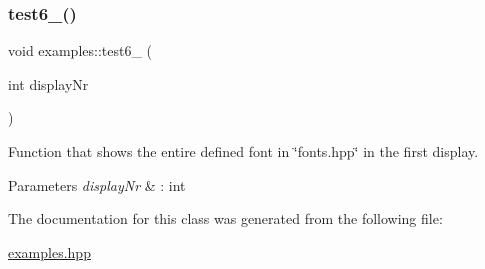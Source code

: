 \subsubsection{\texorpdfstring{test6\+\_()}{test6\_2()}}
{\footnotesize\ttfamily void examples\+::test6\+\_ (\begin{DoxyParamCaption}\item[{int}]{display\+Nr }\end{DoxyParamCaption})\hspace{0.3cm}{\ttfamily [inline]}}



Function that shows the entire defined font in \char`\"{}fonts.\+hpp\char`\"{} in the first display. 


\begin{DoxyParams}{Parameters}
{\em display\+Nr} & \+: int \\
\hline
\end{DoxyParams}


The documentation for this class was generated from the following file\+:\begin{DoxyCompactItemize}
\item 
\hyperlink{examples_8hpp}{examples.\+hpp}\end{DoxyCompactItemize}
